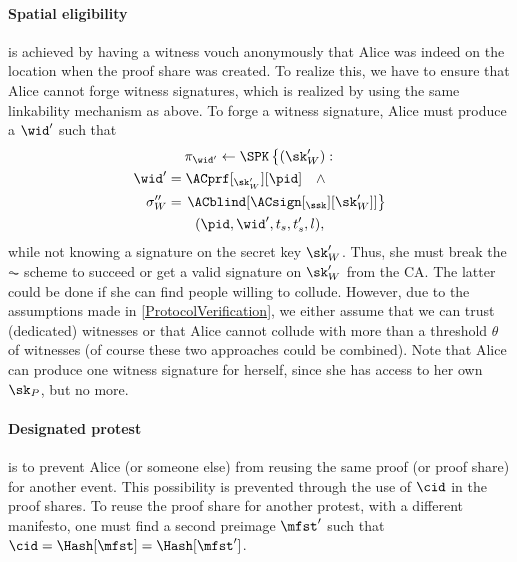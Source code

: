 \paragraph{Spatial eligibility}
\label{analysis-spatial}

 is achieved by having a witness vouch anonymously that Alice was indeed on the location when the proof share was created.
To realize this, we have to ensure that Alice cannot forge witness signatures, which is realized by using the same linkability mechanism as above.
To forge a witness signature, Alice must produce a \(\wid'\) such that
\begin{multline*}
  \pi_{\wid'}\gets \SPK\left\{ (\sk_W') : \right. \\
    \begin{aligned}
      \wid' &= \ACprf[_{\sk_W'}][\pid] \quad \land \\
      \sigma_W'' &= \left. \ACblind[\ACsign[_{\ssk}][\sk_W']] \right\}
    \end{aligned} \\
      (\pid, \wid', t_s, t_s', l),
\end{multline*}
while not knowing a signature on the secret key \(\sk_W'\).
Thus, she must break the \(\AC\) scheme to succeed or get a valid signature on \(\sk_W'\) from the \ac{CA}.
The latter could be done if she can find people willing to collude.
However, due to the assumptions made in \cref{ProtocolVerification}, we either assume that we can trust (dedicated) witnesses or that Alice cannot collude with more than a threshold \(\theta\) of witnesses (of course these two approaches could be combined).
Note that Alice can produce one witness signature for herself, since she has access to her own \(\sk_P\), but no more.

\paragraph{Designated protest}
\label{analysis-designated}

 is to prevent Alice (or someone else) from reusing the same proof (or proof share) for another event.
This possibility is prevented through the use of \(\cid\) in the proof shares.
To reuse the proof share for another protest, with a different manifesto, one must find a second preimage \(\mfst'\) such that \(\cid = \Hash[\mfst] = \Hash[\mfst']\).

